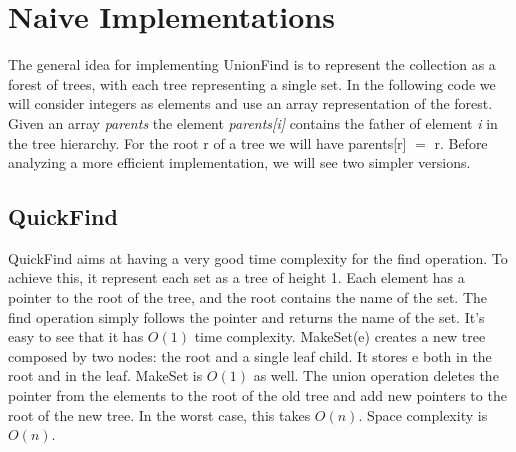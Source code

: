 \documentclass{article}
\begin{document}
\section{Naive Implementations}
The general idea for implementing UnionFind is to represent the collection as a forest of trees, with each tree representing a single set. 
In the following code we will  consider integers as elements and use an array representation of the forest.
Given an array \emph{parents} the element \emph{parents[i]} contains the father of element \emph{i} in the tree hierarchy. For the root
r of a tree we will have parents[r] $=$ r. Before analyzing a more efficient implementation, we will see two simpler versions.

\subsection{QuickFind} \label{QF}
QuickFind aims at having a very good time complexity for the find operation. To achieve this, it represent each set as a tree of height 1. Each element
has a pointer to the root of the tree,  and the root contains the name of the set. The find operation simply follows the pointer and returns the name of the
set. It's easy to see that it has $O(1)$ time complexity. MakeSet(e) creates a new tree composed by two nodes: the root and a single leaf child. It stores e both in the root and
in the leaf. MakeSet is $O(1)$ as well. The union operation deletes the pointer from the elements to the root of the old tree
and add new pointers to the root of the new tree. In the worst case, this takes $O(n)$. Space complexity is $O(n)$. 
\end{document}
